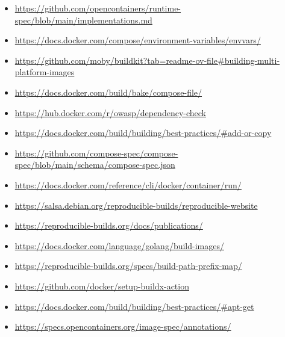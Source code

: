 \documentclass{article}
\begin{document}
\begin{itemize}
  \item \href{https://github.com/opencontainers/runtime-spec/blob/main/implementations.md}{https://github.com/opencontainers/runtime-spec/blob/main/implementations.md}
  \item \href{https://docs.docker.com/compose/environment-variables/envvars/}{https://docs.docker.com/compose/environment-variables/envvars/}
  \item \href{https://github.com/moby/buildkit?tab=readme-ov-file\#building-multi-platform-images}{https://github.com/moby/buildkit?tab=readme-ov-file\#building-multi-platform-images}
  \item \href{https://docs.docker.com/build/bake/compose-file/}{https://docs.docker.com/build/bake/compose-file/}
  \item \href{https://hub.docker.com/r/owasp/dependency-check}{https://hub.docker.com/r/owasp/dependency-check}
  \item \href{https://docs.docker.com/build/building/best-practices/\#add-or-copy}{https://docs.docker.com/build/building/best-practices/\#add-or-copy}
  \item \href{https://github.com/compose-spec/compose-spec/blob/main/schema/compose-spec.json}{https://github.com/compose-spec/compose-spec/blob/main/schema/compose-spec.json}
  \item \href{https://docs.docker.com/reference/cli/docker/container/run/}{https://docs.docker.com/reference/cli/docker/container/run/}
  \item \href{https://salsa.debian.org/reproducible-builds/reproducible-website}{https://salsa.debian.org/reproducible-builds/reproducible-website}
  \item \href{https://reproducible-builds.org/docs/publications/}{https://reproducible-builds.org/docs/publications/}
  \item \href{https://docs.docker.com/language/golang/build-images/}{https://docs.docker.com/language/golang/build-images/}
  \item \href{https://reproducible-builds.org/specs/build-path-prefix-map/}{https://reproducible-builds.org/specs/build-path-prefix-map/}
  \item \href{https://github.com/docker/setup-buildx-action}{https://github.com/docker/setup-buildx-action}
  \item \href{https://docs.docker.com/build/building/best-practices/\#apt-get}{https://docs.docker.com/build/building/best-practices/\#apt-get}
  \item \href{https://specs.opencontainers.org/image-spec/annotations/}{https://specs.opencontainers.org/image-spec/annotations/}

\end{itemize}
\end{document}
